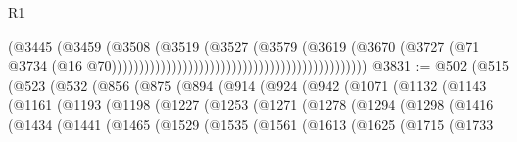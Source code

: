 \begin{lexlean}{R1}
\begin{coremodule}
{{{{{{{{{{{{{{{{{{{{{{{{{{{{{{{{{{{{{{{{{{{{{{{{{{{{{{{{{{{{{{{{{{{{{{{{{{{{{{{{{{{{{{{{{{{{{{{{{{{{{{{{{{{{{{{{{{{{{{{{{{{{{{{{{{{{{{{{{{{{{{{{{{{{{{{{{{{{{{{{{{{{{{{{{{{{{{{{{{{{{{{{{{                                                                            (@3445
                                                                              (@3459
                                                                                (@3508
                                                                                  (@3519
                                                                                    (@3527
                                                                                      (@3579
                                                                                        (@3619
                                                                                          (@3670
                                                                                            (@3727
                                                                                              (@71
                                                                                                @3734
                                                                                                (@16
                                                                                                  @70)))))))))))))))))))))))))))))))))))))))))))))))
@3831 := @502
    (@515
      (@523
        (@532
          (@856
            (@875
              (@894
                (@914
                  (@924
                    (@942
                      (@1071
                        (@1132
                          (@1143
                            (@1161
                              (@1193
                                (@1198
                                  (@1227
                                    (@1253
                                      (@1271
                                        (@1278
                                          (@1294
                                            (@1298
                                              (@1416
                                                (@1434
                                                  (@1441
                                                    (@1465
                                                      (@1529
                                                        (@1535
                                                          (@1561
                                                            (@1613
                                                              (@1625
                                                                (@1715
                                                                  (@1733
}}}}}}}}}}}}}}}}}}}}}}}}}}}}}}}}}}}}}}}}}}}}}}}}}}}}}}}}}}}}}}}}}}}}}}}}}}}}}}}}}}}}}}}}}}}}}}}}}}}}}}}}}}}}}}}}}}}}}}}}}}}}}}}}}}}}}}}}}}}}}}}}}}}}}}}}}}}}}}}}}}}}}}}}}}}}}}}}}}}}}}}}}}
\end{coremodule}
\end{lexlean}
